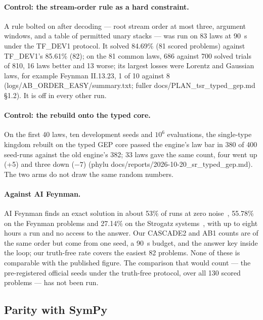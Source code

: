\documentclass[sigconf,nonacm]{acmart}
\newcommand{\src}[1]{{\small\ttfamily #1}}
\begin{document}
\paragraph{Control: the stream-order rule as a hard constraint.} A rule bolted
on after decoding --- root stream order at most three, argument windows, and a
table of permitted unary stacks --- was run on 83 laws at 90~s under the TF\_DEV1
protocol. It solved 84.69\% (81 scored problems) against TF\_DEV1's 85.61\% (82);
on the 81 common laws, 686 against 700 solved trials of 810, 16 laws better and
13 worse; its largest losses were Lorentz and Gaussian laws, for example Feynman
II.13.23, 1 of 10 against 8 (\src{logs/\allowbreak{}AB\_\allowbreak{}ORDER\_\allowbreak{}EASY/\allowbreak{}summary.\allowbreak{}txt};
\src{fuller docs/\allowbreak{}PLAN\_\allowbreak{}tsr\_\allowbreak{}typed\_\allowbreak{}gep.\allowbreak{}md} \S1.2). It is off in every other run.

\paragraph{Control: the rebuild onto the typed core.} On the first 40 laws, ten
development seeds and $10^6$ evaluations, the single-type kingdom rebuilt on the
typed GEP core passed the engine's law bar in 380 of 400 seed-runs against the
old engine's 382; 33 laws gave the same count, four went up (+5) and three down
($-7$) (\src{phylu docs/\allowbreak{}reports/\allowbreak{}2026-10-20\_\allowbreak{}sr\_\allowbreak{}typed\_\allowbreak{}gep.\allowbreak{}md}). The two arms do
not draw the same random numbers.

\paragraph{Against AI Feynman.} AI Feynman finds an exact solution in about
53\% of runs at zero noise~\cite{lacava2021srbench}, 55.78\% on the Feynman
problems and 27.14\% on the Strogatz systems~\cite{kartelj2023rilsrols}, with up
to eight hours a run and no access to the answer. Our CASCADE2 and AB1 counts
are of the same order but come from one seed, a 90~s budget, and the answer key
inside the loop; our truth-free rate covers the easiest 82 problems. None of
these is comparable with the published figure. The comparison that would count
--- the pre-registered official seeds under the truth-free protocol, over all
130 scored problems --- has not been run.

\subsection{Parity with SymPy}
\end{document}
